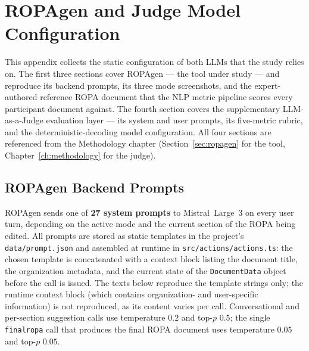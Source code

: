 \chapter{ROPAgen and Judge Model Configuration}
\label{app:ropagen}

This appendix collects the static configuration of both LLMs that the study relies on. The first three sections cover ROPAgen --- the tool under study --- and reproduce its backend prompts, its three mode screenshots, and the expert-authored reference ROPA document that the NLP metric pipeline scores every participant document against. The fourth section covers the supplementary LLM-as-a-Judge evaluation layer --- its system and user prompts, its five-metric rubric, and the deterministic-decoding model configuration. All four sections are referenced from the Methodology chapter (Section~\ref{sec:ropagen} for the tool, Chapter~\ref{ch:methodology} for the judge).


\section{ROPAgen Backend Prompts}
\label{app:ropagen-prompts}

ROPAgen sends one of \textbf{27 system prompts} to Mistral~Large~3 on every user turn, depending on the active mode and the current section of the ROPA being edited. All prompts are stored as static templates in the project's \texttt{data/prompt.json} and assembled at runtime in \texttt{src/actions/actions.ts}: the chosen template is concatenated with a context block listing the document title, the organization metadata, and the current state of the \texttt{DocumentData} object before the call is issued. The texts below reproduce the template strings only; the runtime context block (which contains organization- and user-specific information) is not reproduced, as its content varies per call. Conversational and per-section suggestion calls use temperature $0.2$ and top-$p$ $0.5$; the single \texttt{finalropa} call that produces the final ROPA document uses temperature $0.05$ and top-$p$ $0.05$.

